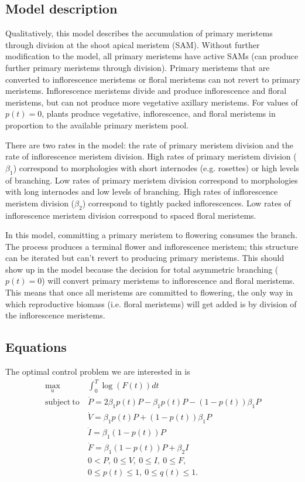 \documentclass[12pt, oneside]{article}   	%
\begin{document}
\subsection{Model description}
Qualitatively, this model describes the accumulation of primary meristems through division at the shoot apical meristem (SAM). Without further modification to the model, all primary meristems have active SAMs (can produce further primary meristems through division). Primary meristems that are converted to inflorescence meristems or floral meristems can not revert to primary meristems. Inflorescence meristems divide and produce inflorescence and floral meristems, but can not produce more vegetative axillary meristems. For values of $p(t)=0$, plants produce vegetative, inflorescence, and floral meristems in proportion to the available primary meristem pool. 

There are two rates in the model: the rate of primary meristem division and the rate of inflorescence meristem division. High rates of primary meristem division ($\beta_1$) correspond to morphologies with short internodes (e.g. rosettes) or high levels of branching. Low rates of primary meristem division correspond to morphologies with long internodes and low levels of branching. High rates of inflorescence meristem division ($\beta_2$) correspond to tightly packed inflorescences. Low rates of inflorescence meristem division correspond to spaced floral meristems. 

In this model, committing a primary meristem to flowering consumes the branch. The process produces a terminal flower and inflorescence meristem; this structure can be iterated but can't revert to producing primary meristems. This should show up in the model because the decision for total asymmetric branching ($p(t)=0$) will convert primary meristems to inflorescence and floral meristems. This means that once all meristems are committed to flowering, the only way in which reproductive biomass (i.e. floral meristems) will get added is by division of the inflorescence meristems. 

\subsection{Equations}

The optimal control problem we are interested in is
%
\begin{align}
\max_{u} &  \int_0^T \log( F(t) ) dt \nonumber \\
\mathrm{subject\ to\ } 
& \dot{P}  = 2 \beta_1 p(t) P - \beta_1 p(t) P - ( 1-p(t) ) \beta_1 P \nonumber \\
& \dot{V} = \beta_1 p(t) P + ( 1-p(t) ) \beta_1 P \nonumber \\
& \dot{I}  = \beta_1 ( 1-p(t) ) P \nonumber \\ 
& \dot{F}  = \beta_1 ( 1-p(t) ) P + \beta_2 I
 \nonumber \\ 
& 0 < P,\ 0 \leq V,\ 0 \leq I,\ 0 \leq F, \nonumber\\
& 0 \leq p(t) \leq 1,\ 0 \leq q(t) \leq 1. \nonumber
\end{align}
\end{document}
